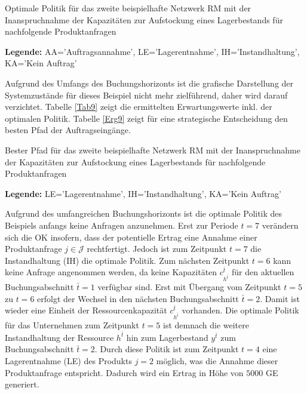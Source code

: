 \begin{table}
\begin{footnotesize}
    \caption{Optimale Politik für das zweite beispielhafte Netzwerk RM mit der Inanspruchnahme der Kapazitäten zur Aufstockung eines Lagerbestands für nachfolgende Produktanfragen} \label{Tab9}
    \vspace*{3mm}
        \begin{center}
      \end{center}
    \begin{center}
      {\footnotesize \textbf{Legende:} AA='Auftragsannahme', LE='Lagerentnahme', IH='Instandhaltung', KA='Kein Auftrag'} 
      \end{center}
\end{footnotesize}
\end{table}

Aufgrund des Umfangs des Buchungshorizonts ist die grafische Darstellung der Systemzustände für dieses Beispiel nicht mehr zielführend, daher wird darauf verzichtet. Tabelle \ref{Tab9} zeigt die ermittelten Erwartungswerte inkl. der optimalen Politik. Tabelle \ref{Erg9} zeigt für eine strategische Entscheidung den besten Pfad der Auftragseingänge.

\begin{table}
\begin{footnotesize}
    \caption{Bester Pfad für das zweite beispielhafte Netzwerk RM mit der Inanspruchnahme der Kapazitäten zur Aufstockung eines Lagerbestands für nachfolgende Produktanfragen} \label{Erg9}
    \vspace*{3mm}
        \begin{center}
      \end{center}
    \begin{center}
      {\footnotesize \textbf{Legende:} LE='Lagerentnahme', IH='Instandhaltung', KA='Kein Auftrag'} 
      \end{center}
\end{footnotesize}
\end{table}

Aufgrund des umfangreichen Buchungshorizonts ist die optimale Politik des Beispiels anfangs keine Anfragen anzunehmen. Erst zur Periode $t=7$ verändern sich die OK insofern, dass der potentielle Ertrag eine Annahme einer Produktanfrage $j\in\mathcal{J}$ rechtfertigt. Jedoch ist zum Zeitpunkt $t=7$ die Instandhaltung (IH) die optimale Politik. Zum nächsten Zeitpunkt $t=6$ kann keine Anfrage angenommen werden, da keine Kapazitäten $c^{\bar{t}}_{h^{\bar t}}$ für den aktuellen Buchungsabschnitt $\bar{t}=1$ verfügbar sind. Erst mit Übergang vom Zeitpunkt $t=5$ zu $t=6$ erfolgt der Wechsel in den nächsten Buchungsabschnitt $\bar{t}=2$. Damit ist wieder eine Einheit der Ressourcenkapazität $c^{\bar{t}}_{h^{\bar{t}}}$ vorhanden. Die optimale Politik für das Unternehmen zum Zeitpunkt $t=5$ ist demnach die weitere Instandhaltung der Ressource $h^{\bar{t}}$ hin zum Lagerbestand $y^{\bar{t}}$ zum Buchungsabschnitt $\bar{t}=2$. Durch diese Politik ist zum Zeitpunkt $t=4$ eine Lagerentnahme (LE) des Produkts $j=2$ möglich, was die Annahme dieser Produktanfrage entspricht. Dadurch wird ein Ertrag in Höhe von $5000$ GE generiert.